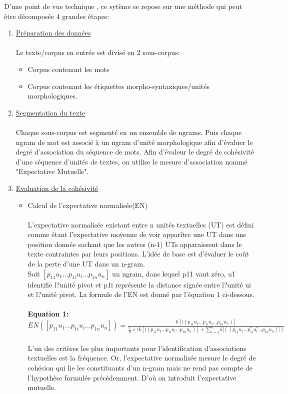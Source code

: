 \documentclass[a4paper,12pt]{article}
\begin{document}
    D'une point de vue technique , ce syt\`eme se repose sur une m\'ethode qui peut \^etre d\'ecompos\'ee 4 grandes \'etapes:
\begin{enumerate}
\item \underline{Pr\'eparation des donn\'ees }\\ \\
Le texte/corpus en entr\'ee est divis\'e en 2 sous-corpus:
 \begin{itemize}
 \item Corpus contenant les mots
 \item Corpus contenant les \'etiquettes morpho-syntaxiques/unit\'es morphologiques. \\
 \end{itemize}

\item \underline{ Segmentation du texte} \\ \\
Chaque sous-corpus est segment\'e en un ensemble de ngrams. Puis chaque ngram de mot est associ\'e \`a un ngram d'unit\'e morphologique afin d'\'evaluer le degr\'e d'association du s\'equence de mots. Afin d'\'evaleur le degr\'e de coh\'esivit\'e d'une  s\'equence d'unit\'es de textes, on utilise le mesure d'association nomm\'e "Expectative Mutuelle".

\item \underline{ Evaluation de la coh\'esivit\'e}

 \begin{itemize}
 \item Calcul de l'expectative normalis\'ee(EN) \\ \\
 L'expectative normalis\'ee existant entre n unit\'es textuelles (UT) est d\'efini comme \'etant l'expectative moyenne de voir appar\^itre une UT dans une position donn\'ee sachant que les autres (n-1) UTs apparaissent dans le texte contraintes par leurs positions. L'id\'ee de base est d'\'evaluer le co\^ut de la perte d'une UT dans un n-gram. \\
Soit  $ [p_{11}  u_{1} ... p_{1i}  u_{i} ... p_{1n}  u_{n} ]$ un ngram, dans lequel p11 vaut z\'ero, u1 identifie l?unit\'e pivot et p1i repr\'esente la distance sign\'ee entre l?unit\'e ui et l?unit\'e pivot.
 La formule de l'EN est donn\'e par l'\'equation 1 ci-dessous.\\
\\ \textbf{Equation 1:}\\
$ EN ([p_{11}  u_{1} ... p_{1i}  u_{i} ... p_{1n}  u_{n} ])  = \frac{k[((p_{11}  u_{1} ... p_{1i}  u_{i} ... p_{1n}  u_{n} )]}{\frac{1}{n} \times ( k[((p_{11}  u_{1} ... p_{1i}  u_{i} ... p_{1n}  u_{n} )] + \sum_{i=2}^{n} k[((p_{11}  u_{1} ... p_{1i}^* u_{i}^* ... p_{1n}  u_{n} )]  )}$
\\ \\ L'un des crit\`eres les plus importants pour l'identification d'associations textuelles est la fr\'equence. Or, l'expectative normalis\'ee mesure le degr\'e de coh\'esion qui lie les constituants d'un n-gram mais ne rend pas compte de l'hypoth\`ese formul\'ee pr\'ec\'edemment. D'o\`u on introduit l'expectative mutuelle.


\end{itemize}
\end{enumerate}
\end{document}

